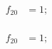 \cite{foo1999}
\autocite{foo1999}

\begin{align}
  f_{20} &= 1;\\
\end{align}

\begin{eqnarray}
  f_{20} &= 1;\\
\end{eqnarray}
